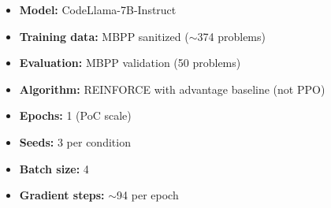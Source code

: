\begin{itemize}
    \item \textbf{Model:} CodeLlama-7B-Instruct
    \item \textbf{Training data:} MBPP sanitized ($\sim$374 problems)
    \item \textbf{Evaluation:} MBPP validation (50 problems)
    \item \textbf{Algorithm:} REINFORCE with advantage baseline (not PPO)
    \item \textbf{Epochs:} 1 (PoC scale)
    \item \textbf{Seeds:} 3 per condition
    \item \textbf{Batch size:} 4
    \item \textbf{Gradient steps:} $\sim$94 per epoch
\end{itemize}

